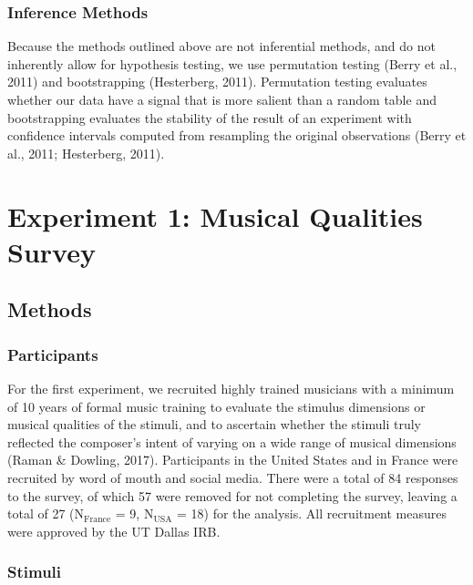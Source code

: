 \documentclass[
  english,
  man,floatsintext]{apa6}
\begin{document}
\hypertarget{inference-methods}{%
\subsubsection{Inference Methods}\label{inference-methods}}

Because the methods outlined above are not inferential methods, and do not inherently allow for hypothesis testing, we use permutation testing (Berry et al., 2011) and bootstrapping (Hesterberg, 2011). Permutation testing evaluates whether our data have a signal that is more salient than a random table and bootstrapping evaluates the stability of the result of an experiment with confidence intervals computed from resampling the original observations (Berry et al., 2011; Hesterberg, 2011).

\hypertarget{experiment-1-musical-qualities-survey}{%
\section{Experiment 1: Musical Qualities Survey}\label{experiment-1-musical-qualities-survey}}

\hypertarget{methods}{%
\subsection{Methods}\label{methods}}

\hypertarget{participants}{%
\subsubsection{Participants}\label{participants}}

For the first experiment, we recruited highly trained musicians with a minimum of 10 years of formal music training to evaluate the stimulus dimensions or musical qualities of the stimuli, and to ascertain whether the stimuli truly reflected the composer's intent of varying on a wide range of musical dimensions (Raman \& Dowling, 2017). Participants in the United States and in France were recruited by word of mouth and social media. There were a total of 84 responses to the survey, of which 57 were removed for not completing the survey, leaving a total of 27 (N\(\mathrm{_{France}}\) = 9, N\(\mathrm{_{USA}}\) = 18) for the analysis. All recruitment measures were approved by the UT Dallas IRB.

\hypertarget{stimuli}{%
\subsubsection{Stimuli}\label{stimuli}}
\end{document}

